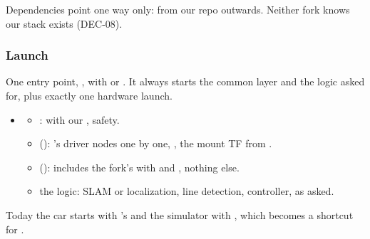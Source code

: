 \documentclass[11pt,a4paper]{article}
\newcommand{\prop}{\target{Proposed}}
\begin{document}
Dependencies point one way only: from our repo outwards. Neither fork knows our stack exists (DEC-08).

\subsubsection{Launch}
One entry point, , with  or . It always starts the common layer and the logic asked for, plus exactly one hardware launch. \prop
\begin{itemize}
  \item {}
  \begin{itemize}
    \item {}:  with our , safety.
    \item {} (): 's driver nodes one by one, , the mount TF from .
    \item {} (): includes the fork's  with  and , nothing else.
    \item the logic: SLAM or localization, line detection, controller, as asked.
  \end{itemize}
\end{itemize}
Today the car starts with 's  and the simulator with , which becomes a shortcut for .
\end{document}
